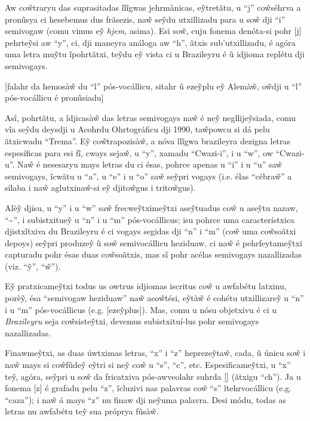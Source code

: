 \documentclass[12pt, a5paper, titlepage]{article}
\begin{document}
\begin{bilingualpages}
    Aw co\~wtraryu das suprasitadas llĩgwas jehrmànicas, e\~ytretãtu, u ``j''
    co\~wséhrva a pronũsya ci hesebemus dus frãsezis, na\~w se\~ydu utxillizadu
    para u so\~w dji ``i'' semivogaw (comu vimus e\~y \textit{hjem}, asima). Esi
    so\~w, cuju fonema denóta-si pohr [j] pehrte\~ysi aw ``y'', ci, dji maneyra
    análoga aw ``h'', ãtxis sub'utxillizadu, é agóra uma letra mu\~ytu ĩpohrtãtxi,
    te\~ydu e\~y vista ci u Brazileyru é ũ idjioma replétu dji semivogays.

        [falahr da hemosà\~w du ``l'' pós-vocállicu, sitahr ũ eze\~yplu e\~y Alemà\~w, o\~wdji u ``l'' pós-vocállicu é pronũsiadu]

    Asî, pohrtãtu, a ĩdjicasà\~w das letras semivogays na\~w é ne\~y
    negllije\~ysiada, comu vĩa se\~ydu deysdji u Acohrdu Ohrtográficu dji 1990,
    ta\~wpowcu si dá pelu ãtxicwadu ``Trema''. E\~y co\~wtrapozisà\~w, a nóva
    llĩgwa brazileyra dezigna letras espesíficas para esi fĩ, cways seja\~w, u
    ``y'', xamadu ``Cwazi-i'', i u ``w'', ow ``Cwazi-u''. Na\~w é nesesaryu mays
    letras du ci ésas, pohrce apenas u ``i'' i u ``u'' sa\~w semivogays, ĩcwãtu u
    ``a'', u ``e'' i u ``o'' sa\~w se\~ypri vogays (i.e. élas ``cébra\~w'' a sílaba
    i na\~w aglutxina\~w-si e\~y djito\~wgus i trito\~wgus).

    Alè\~y djisu, u ``y'' i u ``w'' sa\~w frecwe\~ytxime\~ytxi ase\~ytuadus co\~w u
    ase\~ytu nazaw, ``\textasciitilde'', i subistxitue\~y u ``n'' i u ``m''
    pós-vocállicus; isu pohrce uma característxica djistxĩtxiva du Brazileyru é ci
    vogays segidas dji ``n'' i ``m'' (co\~w uma co\~wsoãtxi depoys) se\~ypri
    produze\~y ũ so\~w semivocállicu heziduaw, ci na\~w é pehrfeytame\~ytxi
    capturadu pohr ésas duas co\~wsoãtxis, mas sĩ pohr acélas semivogays
    nazallizadas (viz. ``\~y'', ``\~w'').

    E\~y pratxicame\~ytxi todus us owtrus idjiomas iscritus co\~w u awfabétu
    latxinu, porè\~y, ésa ``semivogaw heziduaw'' na\~w aco\~wtési, e\~ytà\~w é
    cohétu utxillizare\~y u ``n'' i u ``m'' pós-vocállicus (e.g. [eze\~yplus]).
    Mas, comu u nósu objetxivu é ci u \textit{Brazileyru} seja co\~wsiste\~ytxi,
    devemus subistxituí-lus pohr semivogays nazallizadas.

    Finawme\~ytxi, as duas úwtximas letras, ``x'' i ``z'' hepreze\~yta\~w, cada, ũ
    únicu so\~w i na\~w mays si co\~wfũde\~y e\~ytri si ne\~y co\~w u ``s'', ``c'',
    etc. Espesificame\~ytxi, u ``x'' te\~y, agóra, se\~ypri u so\~w da fricatxiva
    pós-awveolahr suhrda [\textesh] (ãtxigu ``ch''). Ja u fonema [z] é grafadu pelu
    ``z'', ĩcluzivi nas palavras co\~w ``s'' ĩtehrvocállicu (e.g. ``caza''); i
    na\~w á mays ``z'' nu finaw dji ne\~yuma palavra. Desi módu, todas as letras nu
    awfabétu te\~y sua próprya fũsà\~w.


\end{bilingualpages}
\end{document}
